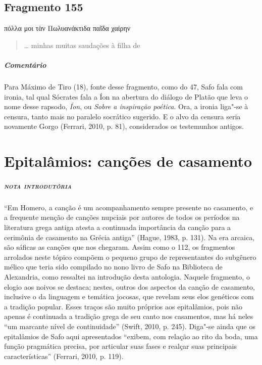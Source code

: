 \section{Fragmento 155}

\begin{gkverse}
πόλλα μοι τὰν Πωλυανάκτιδα παῖδα χαίρην
\end{gkverse}

\begin{verse}
\ldots{} minhas muitas saudações à filha de 
\end{verse}

{\paragraph{Comentário} Para Máximo de Tiro (18), fonte desse fragmento, como do 47, Safo fala com ironia, tal qual
Sócrates fala a Íon na abertura do diálogo de Platão que leva o nome desse
rapsodo, \textit{Íon}, ou \textit{Sobre a inspiração poética}. Ora, a ironia
liga"-se à censura, tanto mais no paralelo socrático sugerido.
E o alvo da censura seria novamente Gorgo (Ferrari, 2010, p. 81), considerados os testemunhos antigos.}



\chapter[Epitalâmios: canções de casamento]{Epitalâmios: canções de casamento}

\paragraph{\textsc{nota introdutória}}
``Em Homero, a canção é um acompanhamento sempre presente no casamento, e a frequente menção de canções nupciais por autores de todos os períodos na literatura grega antiga atesta a continuada importância da canção para a cerimônia de casamento na Grécia antiga” (Hague, 1983, p. 131). Na era arcaica, são sáficas as canções que nos chegaram. Assim como o 112, os fragmentos arrolados neste tópico compõem o pequeno grupo
de representantes do subgênero mélico que teria sido compilado no nono livro de
Safo na Biblioteca de Alexandria, como ressaltei na introdução desta antologia.
Naquele fragmento, o elogio aos noivos se destaca; nestes, outros dos aspectos
da canção de casamento, inclusive o da linguagem e temática jocosas, que
revelam seus elos genéticos com a tradição popular.
Esses traços são muito próprios aos epitalâmios, pois não apenas é continuada a tradição grega de seu canto nos casamentos, mas há neles  “um marcante nível de continuidade” (Swift, 2010, p. 245). Diga"-se ainda que os epitalâmios de Safo aqui apresentados “exibem, com relação ao rito da boda, uma função pragmática precisa, por articular suas fases e realçar suas principais características” (Ferrari, 2010, p. 119). 

